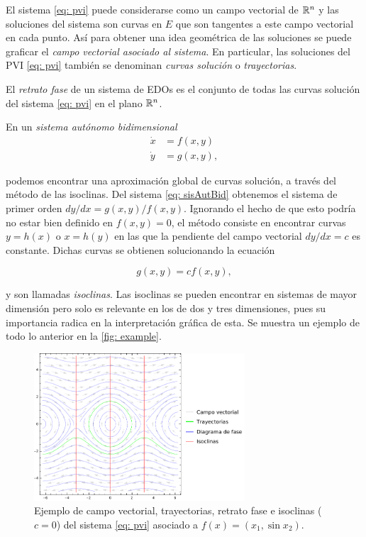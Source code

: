 El sistema \eqref{eq: pvi} puede considerarse como un campo vectorial de ${\mathbb{R}}^{n}$ y las soluciones del sistema son curvas en $E$ que son tangentes a este campo vectorial en cada punto. Así para obtener una idea geométrica de las soluciones se puede graficar el \textit{campo vectorial asociado al sistema}. En particular, las soluciones del PVI \eqref{eq: pvi} también se denominan \textit{curvas solución} o \textit{trayectorias}.



El \textit{retrato fase} de un sistema de EDOs es el conjunto de todas las curvas solución del sistema \eqref{eq: pvi} en el plano ${\mathbb{R}}^{n}$.

En un \textit{sistema autónomo bidimensional}
\begin{equation}
	\begin{aligned}
		\dot{x} &= f(x, y) \\
		\dot{y} &= g(x, y),
	\end{aligned}
	\label{eq: sisAutBid}
\end{equation}

podemos encontrar una aproximación global de curvas solución, a través del método de las isoclinas. Del sistema \eqref{eq: sisAutBid} obtenemos el sistema de primer orden $dy/dx = g(x, y)/f(x, y)$. Ignorando el hecho de que esto podría no estar bien definido en $f(x, y) = 0$, el método consiste en encontrar curvas $y=h(x)$ o $x=h(y)$ en las que la pendiente del campo vectorial $dy/dx = c$ es constante. Dichas curvas se obtienen solucionando la ecuación

\begin{equation}
	g(x, y) = cf(x, y),
	\label{eq: pendiente}
\end{equation}

y son llamadas \textit{isoclinas}. Las isoclinas se pueden encontrar en sistemas de mayor dimensión pero solo es relevante en los de dos y tres dimensiones, pues su importancia radica en la interpretación gráfica de esta. Se muestra un ejemplo de todo lo anterior en la \autoref{fig: example}.

\begin{figure}
	\centering
	\includegraphics[width=0.7\textwidth]{img/Example.pdf}
	\caption{Ejemplo de campo vectorial, trayectorias, retrato fase e isoclinas ($c=0$) del sistema \eqref{eq: pvi} asociado a $f(x)=(x_{1},\sin{x_{2}})$.}
	\label{fig: example}
\end{figure}

